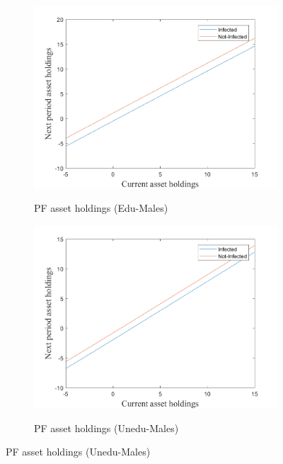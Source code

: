 \begin{figure}[H]\caption{Miopic onset of the epidemic}
\begin{subfigure}{0.5\textwidth}\caption{PF asset holdings (Edu-Males)}
   \includegraphics[width=\linewidth,height = 0.22\textheight]{figures/mio/FIG1.png}
    \label{fig_dert}
\end{subfigure}
\hspace*{\fill}
\begin{subfigure}{0.5\textwidth}\caption{PF asset holdings (Unedu-Males)}
   \includegraphics[width=\linewidth,height = 0.22\textheight]{figures/mio/FIG2.png}
    \label{fig:x_b}
\end{subfigure}

\end{figure}
